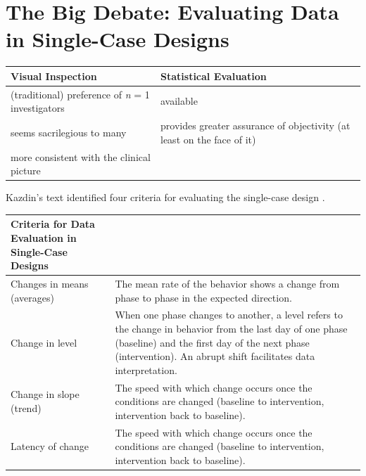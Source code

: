 \documentclass[
  english,
]{book}
\begin{document}
\hypertarget{the-big-debate-evaluating-data-in-single-case-designs}{%
\section{The Big Debate: Evaluating Data in Single-Case Designs}\label{the-big-debate-evaluating-data-in-single-case-designs}}

\begin{longtable}[]{@{}
  >{\raggedright\arraybackslash}p{}
  >{\raggedright\arraybackslash}p{}@{}}
\toprule
Visual Inspection & Statistical Evaluation \\
\midrule
\endhead
(traditional) preference of \emph{n} = 1 investigators & available \\
seems sacrilegious to many & provides greater assurance of objectivity (at least on the face of it) \\
more consistent with the clinical picture & \\
\bottomrule
\end{longtable}

Kazdin's text identified four criteria for evaluating the single-case design \citeyearpar{kazdin_research_2017}.

\begin{longtable}[]{@{}
  >{\raggedright\arraybackslash}p{}
  >{\raggedright\arraybackslash}p{}@{}}
\toprule
Criteria for Data Evaluation in Single-Case Designs & \\
\midrule
\endhead
Changes in means (averages) & The mean rate of the behavior shows a change from phase to phase in the expected direction. \\
Change in level & When one phase changes to another, a level refers to the change in behavior from the last day of one phase (baseline) and the first day of the next phase (intervention). An abrupt shift facilitates data interpretation. \\
Change in slope (trend) & The speed with which change occurs once the conditions are changed (baseline to intervention, intervention back to baseline). \\
Latency of change & The speed with which change occurs once the conditions are changed (baseline to intervention, intervention back to baseline). \\
\bottomrule
\end{longtable}
\end{document}
